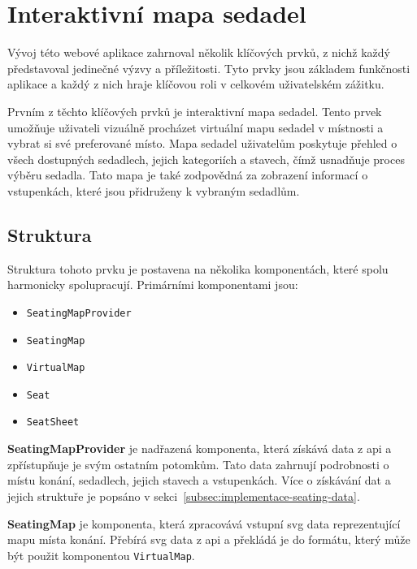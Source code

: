 \section{Interaktivní mapa sedadel}
\label{sec:implementace-seating}
Vývoj této webové aplikace zahrnoval několik klíčových prvků, z nichž každý představoval jedinečné výzvy a příležitosti.
Tyto prvky jsou základem funkčnosti aplikace a každý z nich hraje klíčovou roli v celkovém uživatelském zážitku.

Prvním z těchto klíčových prvků je interaktivní mapa sedadel.
Tento prvek umožňuje uživateli vizuálně procházet virtuální mapu sedadel v místnosti a vybrat si své preferované místo.
Mapa sedadel uživatelům poskytuje přehled o všech dostupných sedadlech, jejich kategoriích a stavech, čímž usnadňuje proces výběru sedadla.
Tato mapa je také zodpovědná za zobrazení informací o vstupenkách, které jsou přidruženy k vybraným sedadlům.

\subsection{Struktura}
\label{subsec:implementace-seating-struktura}
Struktura tohoto prvku je postavena na několika komponentách, které spolu harmonicky spolupracují.
Primárními komponentami jsou:

\begin{itemize}
    \item \texttt{SeatingMapProvider}
    \item \texttt{SeatingMap}
    \item \texttt{VirtualMap}
    \item \texttt{Seat}
    \item \texttt{SeatSheet}
\end{itemize}

\textbf{SeatingMapProvider} je nadřazená komponenta, která získává data z \ac{api} a zpřístupňuje je svým ostatním potomkům.
Tato data zahrnují podrobnosti o místu konání, sedadlech, jejich stavech a vstupenkách.
Více o získávání dat a jejich struktuře je popsáno v sekci~\ref{subsec:implementace-seating-data}.

\textbf{SeatingMap} je komponenta, která zpracovává vstupní \ac{svg} data reprezentující mapu místa konání.
Přebírá \ac{svg} data z \ac{api} a překládá je do formátu, který může být použit komponentou \texttt{VirtualMap}.


